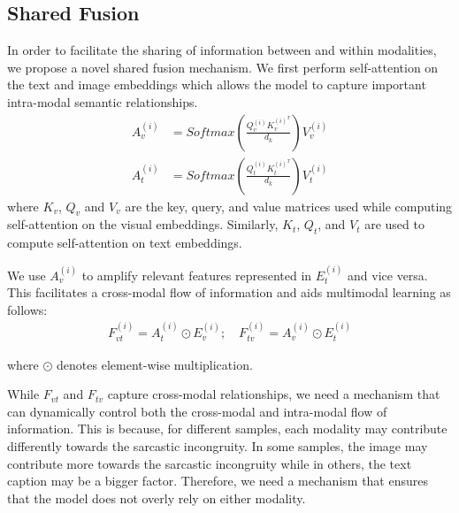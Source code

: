 \subsection{Shared Fusion}
In order to facilitate the sharing of information between and within modalities, we propose a novel shared fusion mechanism. We first perform self-attention \citep{attention-is-all-you-need} on the text and image embeddings which allows the model to capture important intra-modal semantic relationships.  
\begin{equation}
  \label{eq:Self Attention}
  \begin{aligned}
  A_v^{(i)} & = Softmax(\frac{Q_v^{(i)} K_v^{(i)^T}}{d_k})V_v^{(i)} \\
  A_t^{(i)} & = Softmax(\frac{Q_t^{(i)} K_t^{(i)^T}}{d_k})V_t^{(i)}
  \end{aligned}
\end{equation}
\noindent where $K_v$, $Q_v$ and $V_v$ are the key, query, and value matrices used while computing self-attention on the visual embeddings. Similarly, $K_t$, $Q_t$, and $V_t$ are used to compute self-attention on text embeddings. 

We use $A_v^{(i)}$ to amplify relevant features represented in $E_t^{(i)}$ and vice versa. This facilitates a cross-modal flow of information and aids multimodal learning as follows:
\begin{equation}
  \label{eq:Fit-Fti}
  \begin{aligned}
  F_{vt}^{(i)} = A_t^{(i)} \odot E_v^{(i)} ; \quad F_{tv}^{(i)} = A_v^{(i)} \odot E_t^{(i)}
  \end{aligned}
\end{equation}

\noindent where $\odot$ denotes element-wise multiplication. 

While $F_{vt}$ and $F_{tv}$ capture cross-modal relationships, we need a mechanism that can dynamically control both the cross-modal and intra-modal flow of information. This is because, for different samples, 
each modality may contribute differently towards the sarcastic incongruity. In some samples, the image may contribute more towards the sarcastic incongruity while in others, the text caption may be a bigger factor. Therefore, we need a mechanism that ensures that the model does not overly rely on either modality. 


